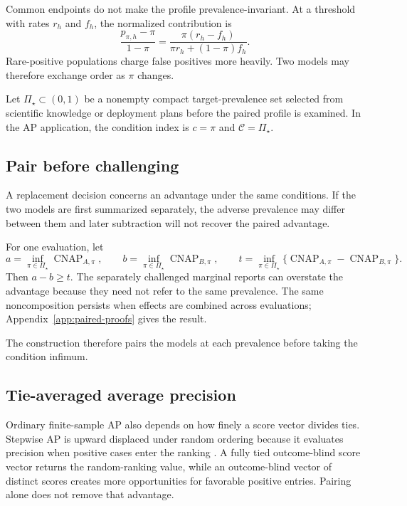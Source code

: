 \documentclass[11pt]{article}
\newcommand{\CNAP}{\operatorname{CNAP}}
\newcommand{\CSet}{\mathcal{C}}
\newcommand{\PSet}{\Pi_\star}
\theoremstyle{remark}
\begin{document}
Common endpoints do not make the profile prevalence-invariant. At a threshold
with rates $r_h$ and $f_h$, the normalized contribution is
\begin{equation}
\frac{p_{\pi,h}-\pi}{1-\pi}
=
\frac{\pi(r_h-f_h)}
{\pi r_h+(1-\pi)f_h}.
\label{eq:threshold-cnap}
\end{equation}
Rare-positive populations charge false positives more heavily. Two models may
therefore exchange order as $\pi$ changes.

Let $\PSet\subset(0,1)$ be a nonempty compact target-prevalence set selected
from scientific knowledge or deployment plans before the paired profile is
examined. In the AP application, the condition index is $c=\pi$ and
$\CSet=\PSet$.

\subsection{Pair before challenging}

A replacement decision concerns an advantage under the same conditions. If
the two models are first summarized separately, the adverse prevalence may
differ between them and later subtraction will not recover the paired
advantage.

For one evaluation, let
\[
a=\inf_{\pi\in\PSet}\CNAP_{A,\pi},
\qquad
b=\inf_{\pi\in\PSet}\CNAP_{B,\pi},
\qquad
t=\inf_{\pi\in\PSet}
\{\CNAP_{A,\pi}-\CNAP_{B,\pi}\}.
\]
Then $a-b\geq t$. The separately challenged marginal reports can overstate the
advantage because they need not refer to the same prevalence. The same
noncomposition persists when effects are combined across evaluations;
Appendix~\ref{app:paired-proofs} gives the result.

The construction therefore pairs the models at each prevalence before taking
the condition infimum.

\subsection{Tie-averaged average precision}
\label{sec:tie-average}

Ordinary finite-sample AP also depends on how finely a score vector divides
ties. Stepwise AP is upward displaced under random ordering because it evaluates
precision when positive cases enter the ranking \cite{bestgen2015random}. A
fully tied outcome-blind score vector returns the random-ranking value, while
an outcome-blind vector of distinct scores creates more opportunities for
favorable positive entries. Pairing alone does not remove that advantage.
\end{document}
